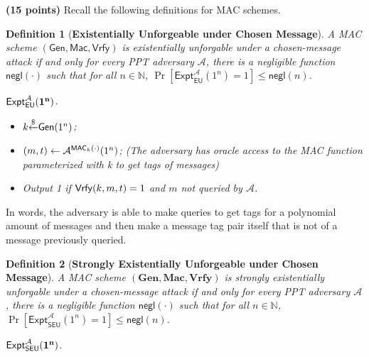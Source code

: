 \documentclass[12pt]{hw}
\newtheorem{definition}{Definition}
\newcommand{\getr}{\ensuremath{{\overset{\$}{\leftarrow}}}\xspace}
\newcommand{\Gen}{\ensuremath{{\sf Gen}}\xspace}
\begin{document}
\begin{exercise}
\textbf{(15 points)}
Recall the following definitions for MAC schemes.

\begin{definition}[\bf{Existentially Unforgeable under Chosen Message}]
    A MAC scheme $(\mathsf{Gen}, \mathsf{Mac}, \mathsf{Vrfy})$ is \emph{existentially unforgable under a chosen-message attack} if and only for every PPT adversary $\mathcal{A}$, 
    there is a negligible function $\mathsf{negl}(\cdot)$ such that 
for all $n \in \mathbb{N}$, $\Pr[\mathsf{Expt}_{\mathsf{EU}}^{\mathcal{A}}(1^n) = 1] \leq \mathsf{negl}(n)$.
    \begin{mdframed}
    
    ${\bf \mathsf{Expt}_{\mathsf{EU}}^{\mathcal{A}}(1^n)}$.
    
    \begin{itemize}
        \item $k \getr \Gen(1^n)$; 
        \item $(m, t) \leftarrow \mathcal{A}^{{\sf MAC}_k(\cdot)}(1^n)$; (The adversary has oracle access to the MAC function parameterized with k to get tags of messages)
        \item Output 1 if ${\sf Vrfy}(k,m,t) = 1$ and $m$ not queried by $\mathcal{A}$.
    \end{itemize}
    \end{mdframed}
\end{definition}
In words, the adversary is able to make queries to get tags for a polynomial amount of messages and then make a message tag pair itself that is not of a message previously queried.
\begin{definition}[\bf{Strongly Existentially Unforgeable under Chosen Message}]
    A MAC scheme $(\mathbf{Gen}, \mathbf{Mac}, \mathbf{Vrfy})$ is \emph{strongly existentially unforgable under a chosen-message attack} if and only for every PPT adversary $\mathcal{A}$, 
    there is a negligible function $\mathsf{negl}(\cdot)$ such that 
for all $n\in \mathbb{N}$, $\Pr[\mathsf{Expt}_{\mathsf{SEU}}^{\mathcal{A}}(1^n) = 1] \leq \mathsf{negl}(n)$.
    
    \begin{mdframed}
    
    ${\bf \mathsf{Expt}_{\mathsf{SEU}}^{\mathcal{A}}(1^n)}$.
    

\end{mdframed}
\end{definition}
\end{exercise}
\end{document}
